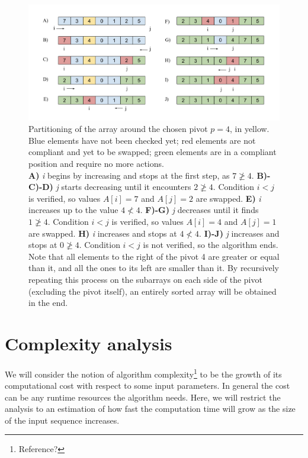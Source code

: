 \documentclass[]{finalproject}
\begin{document}
\begin{figure}[H]
\begin{center}
\includegraphics[scale=0.4]{img/pivot_partitioning.png}
\end{center}
\caption{Partitioning of the array around the chosen pivot $p=4$, in yellow.
Blue elements have not been checked yet; red elements are not compliant and yet to be swapped; green elements are in a compliant position and require no more actions. \\
\textbf{A)} \textit{i} begins by increasing and stops at the first step, as $7 \ngeq 4$.
\textbf{B)-C)-D)} \textit{j} starts decreasing until it encounters $2 \ngeq 4$. Condition $i<j$ is verified, so values $A[i]=7$ and $A[j]=2$ are swapped.
\textbf{E)} \textit{i} increases up to the value $4 \nless 4$.
\textbf{F)-G)} \textit{j} decreases until it finds $1 \ngeq 4$. Condition $i<j$ is verified, so values $A[i]=4$ and $A[j]=1$ are swapped.
\textbf{H)} \textit{i} increases and stops at $4 \nless 4$.
\textbf{I)-J)} \textit{j} increases and stops at $0 \ngeq 4$. Condition $i<j$ is not verified, so the algorithm ends. \\
Note that all elements to the right of the pivot 4 are greater or equal than it, and all the ones to its left are smaller than it.
By recursively repeating this process on the subarrays on each side of the pivot (excluding the pivot itself), an entirely sorted array will be obtained in the end.}
\label{fig:rec-part2}
\end{figure}



\section{Complexity analysis}

We will consider the notion of algorithm complexity\footnote{Reference?} to be the growth of its computational cost with respect to some input parameters. In general the cost can be any runtime resources the algorithm needs. Here, we will restrict the analysis to an estimation of how fast the computation time will grow as the size of the input sequence increases.
\end{document}
